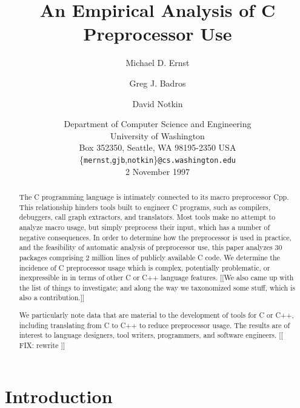 \documentclass[10pt]{article}
\def\numpackages{30}
\def\numlines{2 million}
\begin{document}
% 


\title{An Empirical Analysis of C Preprocessor Use}

\author{Michael D. Ernst \and Greg J. Badros \and David Notkin}

\date{%
Department of Computer Science and Engineering \\
University of Washington \\
Box 352350, Seattle, WA  98195-2350  USA \\
{\small \{{\tt mernst},{\tt gjb},{\tt notkin}\}{\tt @cs.washington.edu}} \\
2 November 1997}  

\maketitle

\begin{abstract}
  The C programming language is intimately connected to its macro
  preprocessor Cpp.  This relationship hinders tools built to engineer C
  programs, such as compilers, debuggers, call graph extractors, and
  translators.  Most tools make no attempt to analyze macro usage, but simply
  preprocess their input, which has a number of negative consequences.  In
  order to determine how the preprocessor is used in practice, and the
  feasibility of automatic analysis of preprocessor use, this paper
  analyzes {\numpackages} packages comprising {\numlines} lines of publicly
  available C code.  We determine the incidence of C preprocessor usage which
  is complex, potentially problematic, or inexpressible in in terms of
  other C or C++ language features.
[[We also came up with the list of things to investigate; and along the way
we taxonomized some stuff, which is also a contribution.]]

  We particularly note data that are
  material to the development of tools for C or C++, including translating
  from C to C++ to reduce preprocessor usage.  The results are of interest
  to language designers, tool writers, programmers, and software
  engineers.
[[ FIX: rewrite ]]
\end{abstract}

\bigskip

\section{Introduction}
\end{document}
